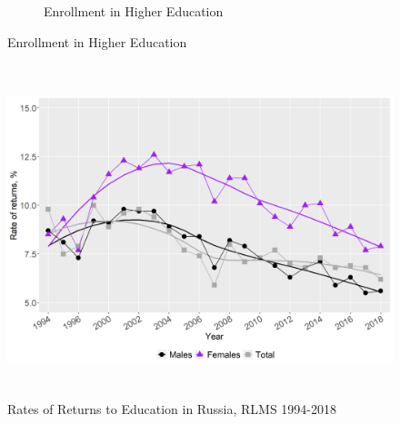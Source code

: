 \documentclass[alpha-refs]{wiley-article-01g}
\begin{document}
\begin{figure}[htbp!]
\begin{subfigure}[b]{0.5\textwidth}
                 \caption{Enrollment in Higher Education}
                 \label{fig:1.3b}
         \end{subfigure}
     \end{figure}


\begin{figure}[htbp!]
 \centering
 \includegraphics[width=\textwidth, height=275pt]{re_edu.png}
 \caption{Rates of Returns to Education in Russia, RLMS 1994-2018}\label{fig:1.2}
\end{figure}
\end{document}
